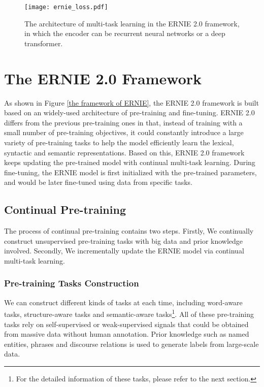 \documentclass[letterpaper]{article} \usepackage{aaai20}  \usepackage{times}  \usepackage{helvet} \usepackage{courier}  \usepackage[hyphens]{url}  \usepackage{graphicx} \usepackage{makecell}
\begin{document}
\begin{figure} 
\centerline
{\texttt{[image: ernie\_loss.pdf]}}
\caption{The architecture of multi-task learning in the ERNIE 2.0 framework, in which the encoder can be recurrent neural networks or a deep transformer.}
\label{ernie_loss}
\end{figure}

\section{The ERNIE 2.0 Framework}
As shown in Figure \ref{the framework of ERNIE}, the ERNIE 2.0 framework is built based on an widely-used architecture of pre-training and fine-tuning. 
ERNIE 2.0 differs from the previous pre-training ones in that, instead of training with a small number of pre-training objectives, it could constantly introduce a large variety of pre-training tasks to help the model efficiently learn the lexical, syntactic and semantic representations. 
Based on this, ERNIE 2.0 framework keeps updating the pre-trained model with continual multi-task learning. 
During fine-tuning, the ERNIE model is first initialized with the pre-trained parameters, and would be later fine-tuned using data from specific tasks.

\subsection{Continual Pre-training}
The process of continual pre-training contains two steps. Firstly, We continually construct unsupervised pre-training tasks with big data and prior knowledge involved. Secondly, We incrementally update the ERNIE model via continual multi-task learning. 
\subsubsection{Pre-training Tasks Construction}
We can construct different kinds of tasks at each time, including word-aware tasks, structure-aware tasks and semantic-aware tasks\footnote{For the detailed information of these tasks, please refer to the next section.}. All of these pre-training tasks rely on self-supervised or weak-supervised signals that could be obtained from massive data without human annotation. Prior knowledge such as named entities, phrases and discourse relations is used to generate labels from large-scale data.
\end{document}
